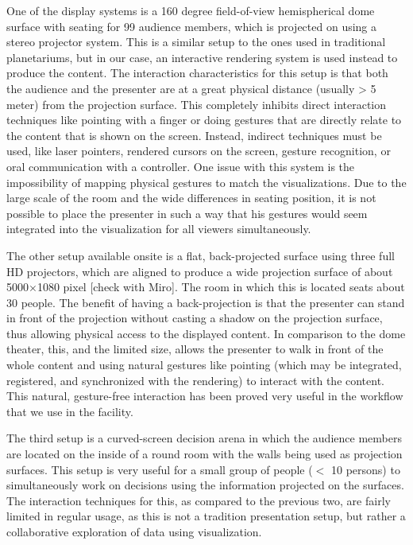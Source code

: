 \documentclass[review,journal]{vgtc}         %
\begin{document}
One of the display systems is a 160 degree field-of-view hemispherical dome surface with seating for 99 audience members, which is projected on using a stereo projector system.
This is a similar setup to the ones used in traditional planetariums, but in our case, an interactive rendering system is used instead to produce the content.
The interaction characteristics for this setup is that both the audience and the presenter are at a great physical distance (usually > 5 meter) from the projection surface.
This completely inhibits direct interaction techniques like pointing with a finger or doing gestures that are directly relate to the content that is shown on the screen.
Instead, indirect techniques must be used, like laser pointers, rendered cursors on the screen, gesture recognition, or oral communication with a controller.
One issue with this system is the impossibility of mapping physical gestures to match the visualizations.
Due to the large scale of the room and the wide differences in seating position, it is not possible to place the presenter in such a way that his gestures would seem integrated into the visualization for all viewers simultaneously.

The other setup available onsite is a flat, back-projected surface using three full HD projectors, which are aligned to produce a wide projection surface of about 5000$\times$1080 pixel [check with Miro].
The room in which this is located seats about 30 people.
The benefit of having a back-projection is that the presenter can stand in front of the projection without casting a shadow on the projection surface, thus allowing physical access to the displayed content.
In comparison to the dome theater, this, and the limited size, allows the presenter to walk in front of the whole content and using natural gestures like pointing (which may be integrated, registered, and synchronized with the rendering) to interact with the content.
This natural, gesture-free interaction has been proved very useful in the workflow that we use in the facility.

The third setup is a curved-screen decision arena in which the audience members are located on the inside of a round room with the walls being used as projection surfaces.
This setup is very useful for a small group of people ($<$ 10 persons) to simultaneously work on decisions using the information projected on the surfaces.
The interaction techniques for this, as compared to the previous two, are fairly limited in regular usage, as this is not a tradition presentation setup, but rather a collaborative exploration of data using visualization.
\end{document}
